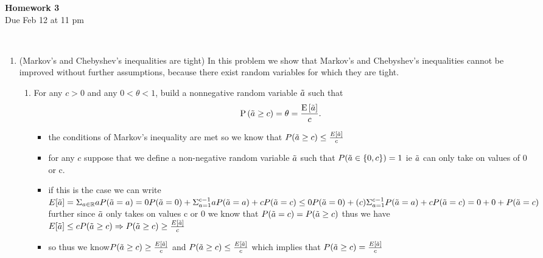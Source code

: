 \documentclass[12pt,twoside]{article}
\begin{document}
\begin{center}
{\large{\textbf{Homework 3}} } \vspace{0.2cm}\\
Due Feb 12 at 11 pm
\\
\end{center}
\\

\begin{enumerate}


\item (Markov's and Chebyshev's inequalities are tight)
In this problem we show that Markov's and Chebyshev's inequalities cannot be improved without further assumptions, because there exist random variables for which they are tight. 
\begin{enumerate}
\item For any $c >0$ and any $0 < \theta < 1$, build a nonnegative random variable $\tilde{  a }$ such that 
\begin{align}
\mathrm{P}\left( \tilde{  a } \geq c \right) = \theta = \frac{\mathrm{E}\left[  \tilde{  a }  \right]}{c}.
\end{align} 
\begin{itemize}
    \item the conditions of Markov's inequality are met so we know that $P(\Tilde{a}\geq c)\leq \frac{E[\Tilde{a}]}{c}$
    \item for any $c$ suppose that we define a non-negative random variable $\Tilde{a}$ such that $P(\Tilde{a}\in\{0,c\})=1$ ie $\Tilde{a}$ can only take on values of 0 or c. 
    \item if this is the case we can write $E[\Tilde{a}]=\Sigma_{a\in \mathbb{R}}aP(\Tilde{a}=a)=0P(\Tilde{a}=0)+\Sigma_{a=1}^{c-1}aP(\Tilde{a}=a)+cP(\Tilde{a}=c)\leq 0P(\Tilde{a}=0)+(c)\Sigma_{a=1}^{c-1}P(\Tilde{a}=a)+cP(\Tilde{a}=c)=0+0+P(\Tilde{a}=c)$ further since $\Tilde{a}$ only takes on values c or 0 we know that $P(\Tilde{a}=c)=P(\Tilde{a}\geq c)$ thus we have $E[\Tilde{a}]\leq c P(\Tilde{a}\geq c)\Rightarrow P(\Tilde{a}\geq c) \geq \frac{E[\Tilde{a}]}{c}$ 
    \item so thus we know$  P(\Tilde{a}\geq c) \geq \frac{E[\Tilde{a}]}{c}$ and  $P(\Tilde{a}\geq c) \leq \frac{E[\Tilde{a}]}{c}$ which implies that $ P(\Tilde{a}\geq c) =\frac{E[\Tilde{a}]}{c}$
\end{itemize}


\end{enumerate}
\end{enumerate}
\end{document}

